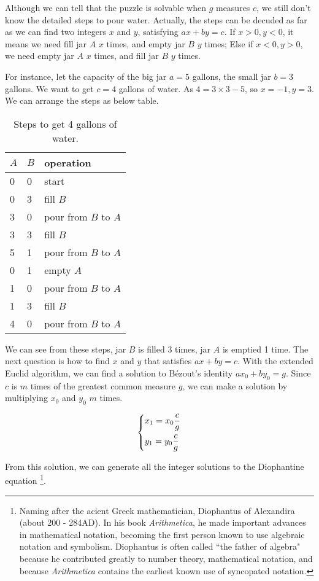 \documentclass{article}
\begin{document}
Although we can tell that the puzzle is solvable when $g$ measures $c$, we still don't know the detailed steps to pour water. Actually, the steps can be decuded as far as we can find two integers $x$ and $y$, satisfying $ax + by = c$. If $x > 0, y < 0$, it means we need fill jar $A$ $x$ times, and empty jar $B$ $y$ times; Else if $x < 0, y > 0$, we need empty jar $A$ $x$ times, and fill jar $B$ $y$ times.

For instance, let the capacity of the big jar $a = 5$ gallons, the small jar $b = 3$ gallons. We want to get $c=4$ gallons of water. As $4 = 3 \times 3 - 5$, so $x = -1, y = 3$. We can arrange the steps as below table.

\begin{table}[htbp]
\centering
\begin{tabular}{l|l|l}
$A$ & $B$ & operation \\
\hline
0 & 0 & start \\
0 & 3 & fill $B$ \\
3 & 0 & pour from $B$ to $A$ \\
3 & 3 & fill $B$ \\
5 & 1 & pour from $B$ to $A$ \\
0 & 1 & empty $A$ \\
1 & 0 & pour from $B$ to $A$ \\
1 & 3 & fill $B$ \\
4 & 0 & pour from $B$ to $A$ \\
\end{tabular}
\caption{Steps to get 4 gallons of water.} \label{tab:designed-jugs-ops}
\end{table}

We can see from these steps, jar $B$ is filled 3 times, jar $A$ is emptied 1 time. The next question is how to find $x$ and $y$ that satisfies $ax + by = c$. With the extended Euclid algorithm, we can find a solution to Bézout's identity $ax_0 + by_0 = g$. Since $c$ is $m$ times of the greatest common measure $g$, we can make a solution by multiplying $x_0$ and $y_0$ $m$ times.

\[
\begin{dcases}
  x_1 = x_0 \dfrac{c}{g} \\
  y_1 = y_0 \dfrac{c}{g}
\end{dcases}
\]

From this solution, we can generate all the integer solutions to the Diophantine equation \footnote{Naming after the acient Greek mathematician, Diophantus of Alexandira (about 200 - 284AD). In his book \textit{Arithmetica}, he made important advances in mathematical notation, becoming the first person known to use algebraic notation and symbolism. Diophantus is often called “the father of algebra" because he contributed greatly to number theory, mathematical notation, and because \textit{Arithmetica} contains the earliest known use of syncopated notation\cite{HanXueTao2009}.}.
\end{document}
